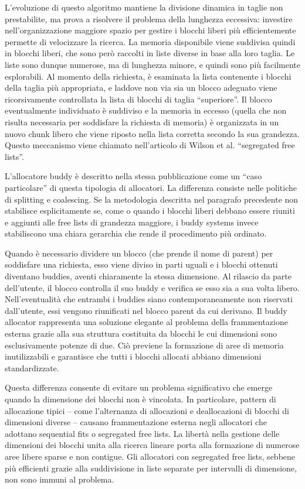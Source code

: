 L’evoluzione di questo algoritmo mantiene la divisione dinamica in taglie non prestabilite, ma prova a risolvere il problema della lunghezza eccessiva: investire nell’organizzazione maggiore spazio per gestire i blocchi liberi più efficientemente permette di velocizzare la ricerca. La memoria disponibile viene suddivisa quindi in blocchi liberi, che sono però raccolti in liste diverse in base alla loro taglia. Le liste sono dunque numerose, ma di lunghezza minore, e quindi sono più facilmente esplorabili. Al momento della richiesta, è esaminata la lista contenente i blocchi della taglia più appropriata, e laddove non via sia un blocco adeguato viene ricorsivamente controllata la lista di blocchi di taglia “superiore”. Il blocco eventualmente individuato è suddiviso e la memoria in eccesso (quella che non risulta necessaria per soddisfare la richiesta di memoria) è organizzata in un nuovo chunk libero che viene riposto nella lista corretta secondo la sua grandezza. Questo meccanismo viene chiamato nell’articolo di Wilson et al. ``segregated free lists''.

L’allocatore buddy è descritto nella stessa pubblicazione come un ``caso particolare'' di questa tipologia di allocatori. La differenza consiste nelle politiche di splitting e coalescing. Se la metodologia descritta nel paragrafo precedente non stabilisce esplicitamente se, come o quando i blocchi liberi debbano essere riuniti e aggiunti alle free lists di grandezza maggiore, i buddy systems invece stabiliscono una chiara gerarchia che rende il procedimento più ordinato.

Quando è necessario dividere un blocco (che prende il nome di parent) per soddisfare una richiesta, esso viene diviso in parti uguali e i blocchi ottenuti diventano buddies, aventi chiaramente la stessa dimensione. Al rilascio da parte dell’utente, il blocco controlla il suo buddy e verifica se esso sia a sua volta libero. Nell’eventualità che entrambi i buddies siano contemporaneamente non riservati dall’utente, essi vengono riunificati nel blocco parent da cui derivano. Il buddy allocator rappresenta una soluzione elegante al problema della frammentazione esterna grazie alla sua struttura costituita da blocchi le cui dimensioni sono esclusivamente potenze di due. Ciò previene la formazione di aree di memoria inutilizzabili e garantisce che tutti i blocchi allocati abbiano dimensioni standardizzate.

Questa differenza consente di evitare un problema significativo che emerge quando la dimensione dei blocchi non è vincolata. In particolare, pattern di allocazione tipici – come l'alternanza di allocazioni e deallocazioni di blocchi di dimensioni diverse – causano frammentazione esterna negli allocatori che adottano sequential fits o segregated free lists. La libertà nella gestione delle dimensioni dei blocchi unita alla ricerca lineare porta alla formazione di numerose aree libere sparse e non contigue. Gli allocatori con segregated free lists, sebbene più efficienti grazie alla suddivisione in liste separate per intervalli di dimensione, non sono immuni al problema.

